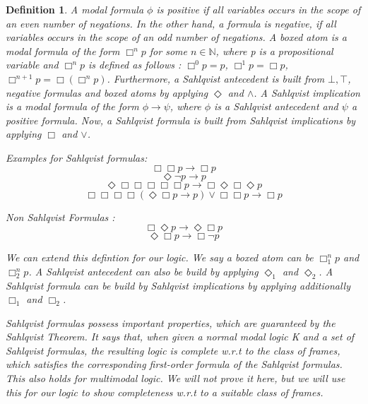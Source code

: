 \documentclass[12pt, a4paper]{scrartcl}
\newtheorem{definition}{Definition}[subsection]
\begin{document}
\begin{definition}
    A modal formula $\phi$ is positive if all variables occurs in the scope of an even number of negations. In the other hand, a formula is negative, if all variables occurs in the scope of an odd number of negations.
    A boxed atom is a modal formula of the form $\Box^n p$ for some $n \in \mathbb{N}$, where p is a propositional variable and $\Box^n p$ is defined as follows :
    $\Box^0 p = p$, $\Box^1 p = \Box p$, $\Box^{n+1} p = \Box(\Box^n p)$. \newline \newline
    Furthermore, a Sahlqvist antecedent is built from $\bot, \top$, negative formulas and boxed atoms by applying $\Diamond$ and $\land$. A Sahlqvist implication is a modal formula of the form
    $\phi \rightarrow \psi$, where $\phi$ is a Sahlqvist antecedent and $\psi$ a positive formula. \newline
    Now, a Sahlqvist formula is built from Sahlqvist implications by applying $\Box$ and $\lor$. \newline
    
    Examples for Sahlqvist formulas: 
    $$\Box \Box p \rightarrow \Box p$$
    $$ \Diamond \neg p\rightarrow p$$
    $$ \Diamond \Box \Box \Box \Box \Box p\rightarrow \Box \Diamond \Box \Diamond p$$
    $$ \Box\Box\Box\Box(\Diamond \Box p\rightarrow p) \lor \Box \Box p \rightarrow \Box p $$
    
    Non Sahlqvist Formulas :
    $$\Box \Diamond p \rightarrow \Diamond \Box p$$
    $$\Diamond \Box p \rightarrow \Box \neg p$$ \newline
    
    We can extend this defintion for our logic. We say a boxed atom can be $\Box^n_1 p$ and $\Box^n_2 p$. A Sahlqvist antecedent
    can also be build by applying $\Diamond_1$ and $\Diamond_2$. A Sahlqvist formula can be build by
    Sahlqvist implications by applying additionally $\Box_1$ and $\Box_2$.  \newline
    
    Sahlqvist formulas possess important properties, which are guaranteed by the Sahlqvist Theorem. It says that, when given a normal modal logic K and a set of Sahlqvist formulas, the resulting logic is complete w.r.t 
    to the class of frames, which satisfies the corresponding first-order formula of the Sahlqvist formulas. This also holds for multimodal logic. We will not prove it here, but we will use this
    for our logic to show completeness w.r.t to a suitable class of frames.
    \newline
        
\end{definition}
\end{document}
